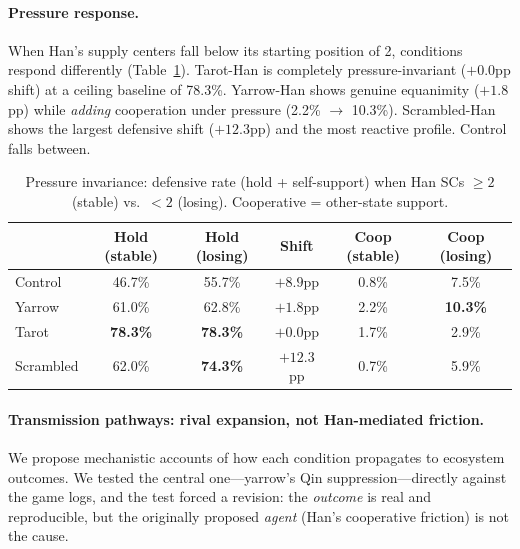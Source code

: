 \documentclass[11pt]{article}
\begin{document}
\paragraph{Pressure response.} When Han's supply centers fall below its starting position of 2, conditions respond differently (Table~\ref{tab:pressure}). Tarot-Han is completely pressure-invariant ($+0.0$pp shift) at a ceiling baseline of 78.3\%. Yarrow-Han shows genuine equanimity ($+1.8$pp) while \emph{adding} cooperation under pressure (2.2\% $\to$ 10.3\%). Scrambled-Han shows the largest defensive shift ($+12.3$pp) and the most reactive profile. Control falls between.

\begin{table}[t]
\centering
\caption{Pressure invariance: defensive rate (hold + self-support) when Han SCs $\geq 2$ (stable) vs.\ $< 2$ (losing). Cooperative = other-state support.}
\label{tab:pressure}
\begin{tabular}{lccccc}
\toprule
& Hold (stable) & Hold (losing) & Shift & Coop (stable) & Coop (losing) \\
\midrule
Control & 46.7\% & 55.7\% & $+8.9$pp & 0.8\% & 7.5\% \\
Yarrow & 61.0\% & 62.8\% & $+1.8$pp & 2.2\% & \textbf{10.3\%} \\
Tarot & \textbf{78.3\%} & \textbf{78.3\%} & $+0.0$pp & 1.7\% & 2.9\% \\
Scrambled & 62.0\% & \textbf{74.3\%} & $+12.3$pp & 0.7\% & 5.9\% \\
\bottomrule
\end{tabular}
\end{table}

\paragraph{Transmission pathways: rival expansion, not Han-mediated friction.} We propose mechanistic accounts of how each condition propagates to ecosystem outcomes. We tested the central one---yarrow's Qin suppression---directly against the game logs, and the test forced a revision: the \emph{outcome} is real and reproducible, but the originally proposed \emph{agent} (Han's cooperative friction) is not the cause.
\end{document}
